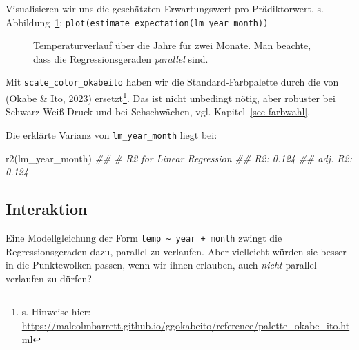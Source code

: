 \documentclass[
  letterpaper,
]{scrbook}
\newenvironment{Shaded}{\begin{snugshade}}{\end{snugshade}}
\newcommand{\DocumentationTok}[1]{\textcolor[rgb]{0.37,0.37,0.37}{\textit{#1}}}
\newcommand{\FunctionTok}[1]{\textcolor[rgb]{0.28,0.35,0.67}{#1}}
\newcommand{\NormalTok}[1]{\textcolor[rgb]{0.00,0.23,0.31}{#1}}
\theoremstyle{definition}
\theoremstyle{definition}
\theoremstyle{definition}
\theoremstyle{remark}
\begin{document}
Visualisieren wir uns die geschätzten Erwartungswert pro Prädiktorwert,
s. Abbildung~\ref{fig-lm3}:
\texttt{plot(estimate\_expectation(lm\_year\_month))}

\begin{figure}


\caption{\label{fig-lm3}Temperaturverlauf über die Jahre für zwei
Monate. Man beachte, dass die Regressionsgeraden \emph{parallel} sind.}

\end{figure}%

Mit \texttt{scale\_color\_okabeito} haben wir die Standard-Farbpalette
durch die von (Okabe \& Ito, 2023) ersetzt\footnote{s. Hinweise hier:
  \url{https://malcolmbarrett.github.io/ggokabeito/reference/palette_okabe_ito.html}}.
Das ist nicht unbedingt nötig, aber robuster bei Schwarz-Weiß-Druck und
bei Sehschwächen, vgl. Kapitel~\ref{sec-farbwahl}.

Die erklärte Varianz von \texttt{lm\_year\_month} liegt bei:

\begin{Shaded}
\begin{Highlighting}[]
\FunctionTok{r2}\NormalTok{(lm\_year\_month)}
\DocumentationTok{\#\# \# R2 for Linear Regression}
\DocumentationTok{\#\#        R2: 0.124}
\DocumentationTok{\#\#   adj. R2: 0.124}
\end{Highlighting}
\end{Shaded}

\subsection{Interaktion}\label{interaktion}

Eine Modellgleichung der Form
\texttt{temp\ \textasciitilde{}\ year\ +\ month} zwingt die
Regressionsgeraden dazu, parallel zu verlaufen. Aber vielleicht würden
sie besser in die Punktewolken passen, wenn wir ihnen erlauben, auch
\emph{nicht} parallel verlaufen zu dürfen?
\end{document}
